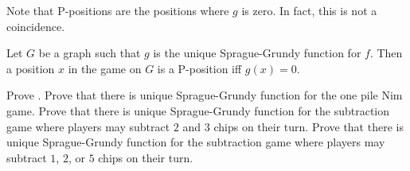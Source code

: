 Note that P-positions are the positions where $g$ is zero. In fact,
this is not a coincidence.
\begin{theorem}
\label{theorem:grundy-to-np}
    Let $G$ be a graph such that $g$ is the unique Sprague-Grundy function for $f$.
    Then a position $x$ in the game on $G$ is a P-position iff $g(x) = 0$.
\end{theorem}


\begin{chapterendexercises}
    \exercise Prove .
    \exercise Prove that there is unique Sprague-Grundy function for the one pile
        Nim game.
    \exercise Prove that there is unique Sprague-Grundy function for the
        subtraction game where players may subtract $2$ and $3$ chips on their
        turn.
    \exercise
       Prove that there is unique Sprague-Grundy function for the subtraction
       game where players may subtract $1$, $2$, or $5$ chips
       on their turn.
\end{chapterendexercises}

